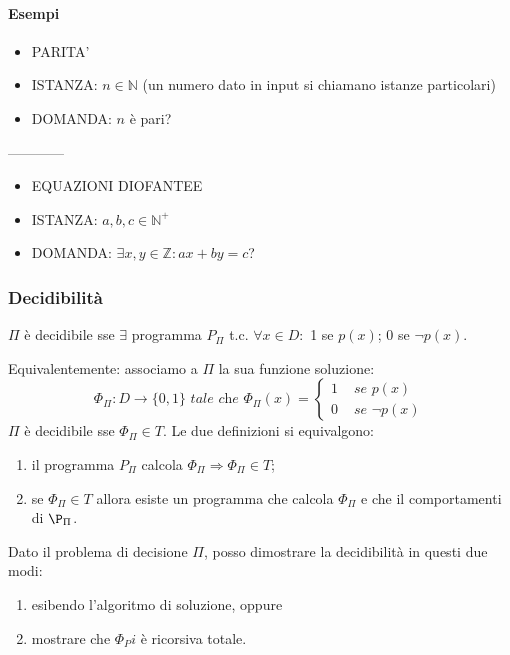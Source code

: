 \documentclass{article}
\begin{document}
\paragraph{Esempi}

\begin{itemize}
	\item PARITA'
	\item ISTANZA: $n \in \mathbb{N}$ (un numero dato in input si chiamano istanze particolari)
	\item DOMANDA: $n$ è pari?
\end{itemize}




------------



\begin{itemize}
	\item EQUAZIONI DIOFANTEE
	\item ISTANZA: $a,b,c \in \mathbb{N}^+$
	\item DOMANDA: $\exists x,y \in \mathbb{Z}:ax+by=c$?
\end{itemize}

\subsubsection{Decidibilità}
$\Pi$ è decidibile sse $\exists$ programma $P_{\Pi}$ t.c. $\forall x \in D:$ 1 se $p(x)$; 0 se $\neg p(x)$.



Equivalentemente: associamo a $\Pi$ la sua funzione soluzione:
\begin{displaymath}
	\Phi_\Pi: D \rightarrow \{0,1\}\textit{ tale che }\Phi_\Pi(x)=
	\begin{cases}
		1 &\textit{ se } p(x) \\
		0 &\textit{ se } \neg p(x) 
	\end{cases}
\end{displaymath}
$\Pi$ è decidibile sse $\Phi_\Pi \in T$.
Le due definizioni si equivalgono:
\begin{enumerate}
	\item il programma $P_\Pi$ calcola $\Phi_\Pi \Rightarrow \Phi_\Pi \in T$;
	\item se $\Phi_\Pi \in T$ allora esiste un programma che calcola $\Phi_\Pi$ e che il comportamenti di $\P_\Pi$.
\end{enumerate}




Dato il problema di decisione $\Pi$, posso dimostrare la decidibilità in questi due modi:
\begin{enumerate}
	\item esibendo l'algoritmo di soluzione, oppure
	\item mostrare che $\Phi_Pi$ è ricorsiva totale.
\end{enumerate}
\end{document}
